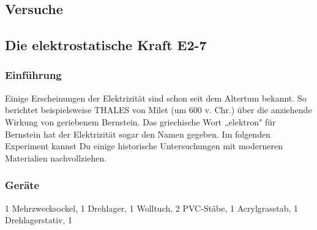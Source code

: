 \documentclass{report}
\begin{document}
\subsection{Versuche} \subsection{Die elektrostatische Kraft E2-7}

\subsubsection{Einführung} Einige Erscheinungen der Elektrizität sind schon
seit dem Altertum bekannt. So berichtet beispielsweise THALES von Milet (um 600
v. Chr.) über die anziehende Wirkung von geriebenem Bernstein. Das griechische
Wort „elektron" für Bernstein hat der Elektrizität sogar den Namen gegeben. Im
folgenden Experiment kannst Du einige historische Untersuchungen mit moderneren
Materialien nachvollziehen. \subsubsection{Geräte} 1 Mehrzwecksockel, 1
Drehlager, 1 Wolltuch, 2 PVC-Stäbe, 1 Acrylgrasstab, 1 Drehlagerstativ, 1
\end{document}
